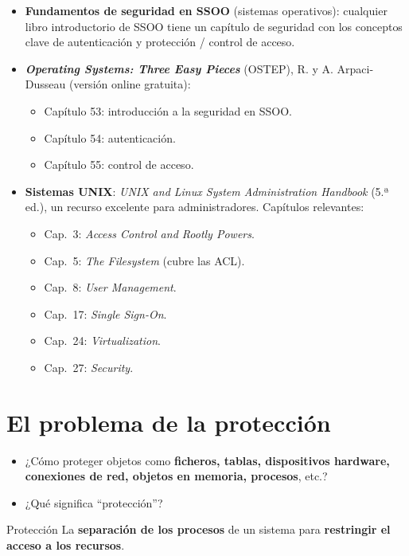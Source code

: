 \documentclass[11pt,a4paper]{report}
\begin{document}
\begin{itemize}
  \item \textbf{Fundamentos de seguridad en SSOO} (sistemas operativos): cualquier libro introductorio de SSOO tiene un capítulo de seguridad con los conceptos clave de autenticación y protección / control de acceso.
  \item \textbf{\emph{Operating Systems: Three Easy Pieces}} (OSTEP), R. y A. Arpaci-Dusseau (versión online gratuita):
    \begin{itemize}
      \item Capítulo 53: introducción a la seguridad en SSOO.
      \item Capítulo 54: autenticación.
      \item Capítulo 55: control de acceso.
    \end{itemize}
  \item \textbf{Sistemas UNIX}: \emph{UNIX and Linux System Administration Handbook} (5.ª ed.), un recurso excelente para administradores. Capítulos relevantes:
    \begin{itemize}
      \item Cap.~3: \emph{Access Control and Rootly Powers}.
      \item Cap.~5: \emph{The Filesystem} (cubre las ACL).
      \item Cap.~8: \emph{User Management}.
      \item Cap.~17: \emph{Single Sign-On}.
      \item Cap.~24: \emph{Virtualization}.
      \item Cap.~27: \emph{Security}.
    \end{itemize}
\end{itemize}
 
\section{El problema de la protección}
 
\begin{itemize}
  \item ¿Cómo proteger objetos como \textbf{ficheros, tablas, dispositivos hardware, conexiones de red, objetos en memoria, procesos}, etc.?
  \item ¿Qué significa ``protección''?
\end{itemize}
 
\begin{definicion}{Protección}
La \textbf{separación de los procesos} de un sistema para \textbf{restringir el acceso a los recursos}.
\end{definicion}
 
\end{document}
